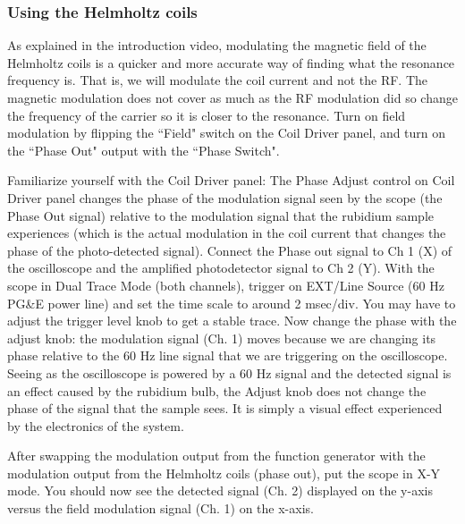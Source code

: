\documentclass[11pt]{article}
\begin{document}
\subsubsection{Using the Helmholtz coils}
As explained in the introduction video, modulating the magnetic field of the Helmholtz coils is a quicker and more accurate way of finding what the resonance frequency is. That is, we will modulate the coil current and not the RF. The magnetic modulation does not cover as much as the RF modulation did so change the frequency of the carrier so it is closer to the resonance. Turn on field modulation by flipping the ``Field" switch on the Coil Driver panel, and turn on the ``Phase Out" output with the ``Phase Switch".

Familiarize yourself with the Coil Driver panel: The Phase Adjust control on Coil Driver panel changes the phase of the modulation signal seen by the scope (the Phase Out signal) relative to the modulation signal that the rubidium sample experiences (which is the actual modulation in the coil current that changes the phase of the photo-detected signal). Connect the Phase out signal to Ch 1 (X) of the oscilloscope and the amplified photodetector signal to Ch 2 (Y). With the scope in Dual Trace Mode (both channels), trigger on EXT/Line Source (60 Hz PG\&E power line) and set the time scale to around 2 msec/div. You may have to adjust the trigger level knob to get a stable trace. Now change the phase with the adjust knob: the modulation signal (Ch. 1) moves because we are changing its phase relative to the 60 Hz line signal that we are triggering on the oscilloscope. Seeing as the oscilloscope is powered by a 60 Hz signal and the detected signal is an effect caused by the rubidium bulb, the Adjust knob does not change the phase of the signal that the sample sees. It is simply a visual effect experienced by the electronics of the system. 

After swapping the modulation output from the function generator with the modulation output from the Helmholtz coils (phase out), put the scope in X-Y mode. You should now see the detected signal (Ch. 2) displayed on the y-axis versus the field modulation signal (Ch. 1) on the x-axis.

\end{document}
